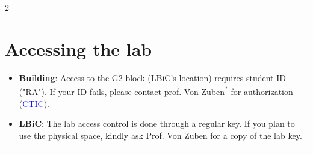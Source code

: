 \documentclass[a4paper, landscape]{article}
\begin{document}
\begin{multicols}{2}
\raggedcolumns
\section*{Accessing the lab}
\label{sec:org7ca4c03}
\vspace{-2mm}
\begin{itemize}
\item \textbf{Building}: Access to the G2 block (LBiC's location) requires student ID ("RA"). If your ID fails, please contact prof. Von Zuben\textsuperscript{*} for authorization (\href{https://site.fee.unicamp.br/ctic/faq\detokenize{#}acesso_laboratorio}{\textcolor{blue}{\uline{CTIC}}}).
\item \textbf{LBiC}: The lab access control is done through a regular key. If you plan to use the physical space, kindly ask Prof. Von Zuben for a copy of the lab key.
\end{itemize}

\vspace{-1em}\noindent\rule{\linewidth}{0.4pt}\vspace{-1.25em}

\end{multicols}
\end{document}
